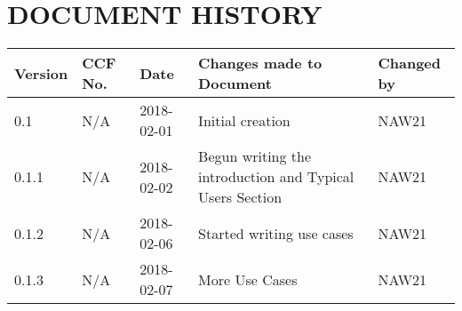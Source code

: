 \documentclass{project}
\begin{document}
\section*{DOCUMENT HISTORY}
\begin{tabular}{|l | l | l | l | l |}
\hline
Version & CCF No. & Date & Changes made to Document & Changed by \\
\hline
0.1 & N/A & 2018-02-01 & Initial creation & NAW21 \\
\hline
0.1.1 & N/A & 2018-02-02 & Begun writing the introduction and Typical Users Section & NAW21 \\
\hline
0.1.2 & N/A & 2018-02-06 & Started writing use cases & NAW21 \\
\hline
0.1.3 & N/A & 2018-02-07 & More Use Cases & NAW21 \\
\hline
\end{tabular}
\label{thelastpage}
\end{document}
